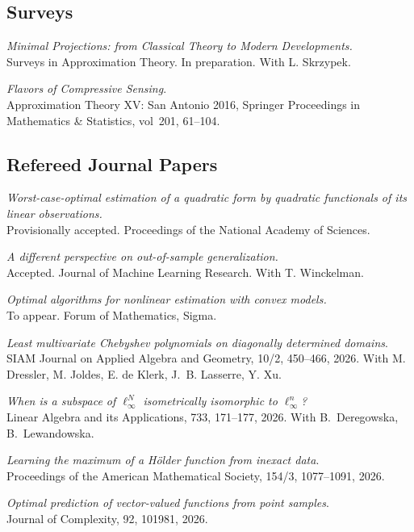 \documentclass[11pt]{article}
\begin{document}
\subsection{Surveys}
\betaremune
\item {\sl Minimal Projections:
from Classical Theory to Modern Developments.}\\
Surveys in Approximation Theory. In preparation. With L. Skrzypek.
\item {\sl Flavors of Compressive Sensing}.\\
Approximation Theory XV: San Antonio 2016,
Springer Proceedings in Mathematics \& Statistics,
vol~201, 61--104. 
\eetaremune

\subsection{Refereed Journal Papers}
\betaremune
\item {\sl Worst-case-optimal estimation of a quadratic form by quadratic functionals of its linear observations.}\\
Provisionally accepted. Proceedings of the National Academy of Sciences.
\item {\sl A different perspective on out-of-sample generalization.}\\
Accepted. Journal of Machine Learning Research. With T. Winckelman.
\item {\sl Optimal algorithms for nonlinear estimation with convex models.}\\
To appear. Forum of Mathematics, Sigma.
\item {\sl Least multivariate Chebyshev polynomials on diagonally determined domains}.\\
SIAM Journal on Applied Algebra and Geometry, 10/2, 450--466, 2026.
With M.  Dressler, M.  Joldes, E. de Klerk, J.~B. Lasserre,  Y. Xu.
\item {\sl When is a subspace of $\ell_\infty^N$ isometrically isomorphic to $\ell_\infty^n$?}\\
Linear Algebra and its Applications, 733, 171--177, 2026. With B.~Deregowska, B.~Lewandowska. 
\item {\sl Learning the maximum of a H\"older function from inexact data}.\\
Proceedings of the American Mathematical Society,
154/3, 1077--1091, 2026.
\item {\sl Optimal prediction of vector-valued functions from point samples}.\\
Journal of Complexity, 92, 101981, 2026. 
\end{document}
